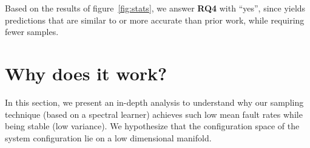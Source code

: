 




\begin{myshadowbox}
Based on the results of figure~\ref{fig:stats}, we answer {\bf RQ4} with ``yes'',
since \what yields predictions that are similar to or more accurate than prior
work, while requiring fewer samples.
\end{myshadowbox}

\section{Why does it work?}
In this section, we present an in-depth analysis to understand why our sampling technique (based on a spectral learner) achieves such low mean fault rates while being stable (low variance). We hypothesize that the configuration space of the system configuration lie on a low dimensional manifold. 

